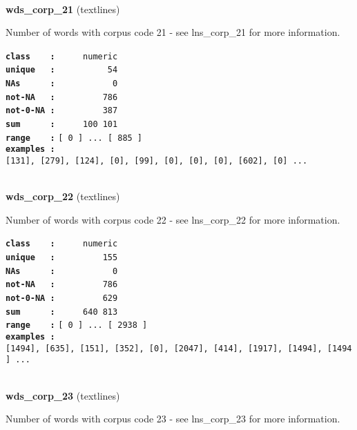 \documentclass[]{article}
\begin{document}
~

\textbf{wds\_corp\_21} (textlines)

Number of words with corpus code 21 - see lns\_corp\_21 for more
information.

\textbf{\texttt{class\ \ \ \ :}} \texttt{~~~~~numeric}\\
\textbf{\texttt{unique\ \ \ :}} \texttt{~~~~~~~~~~54}\\
\textbf{\texttt{NAs\ \ \ \ \ \ :}} \texttt{~~~~~~~~~~~0}\\
\textbf{\texttt{not-NA\ \ \ :}} \texttt{~~~~~~~~~786}\\
\textbf{\texttt{not-0-NA\ :}} \texttt{~~~~~~~~~387}\\
\textbf{\texttt{sum\ \ \ \ \ \ :}} \texttt{~~~~~100~101}\\
\textbf{\texttt{range\ \ \ \ :}}
\texttt{{[}\ 0\ {]}\ ...\ {[}\ 885\ {]}}\\
\textbf{\texttt{examples\ :}}
\texttt{{[}131{]},\ {[}279{]},\ {[}124{]},\ {[}0{]},\ {[}99{]},\ {[}0{]},\ {[}0{]},\ {[}0{]},\ {[}602{]},\ {[}0{]}\ ...}\\

~

\textbf{wds\_corp\_22} (textlines)

Number of words with corpus code 22 - see lns\_corp\_22 for more
information.

\textbf{\texttt{class\ \ \ \ :}} \texttt{~~~~~numeric}\\
\textbf{\texttt{unique\ \ \ :}} \texttt{~~~~~~~~~155}\\
\textbf{\texttt{NAs\ \ \ \ \ \ :}} \texttt{~~~~~~~~~~~0}\\
\textbf{\texttt{not-NA\ \ \ :}} \texttt{~~~~~~~~~786}\\
\textbf{\texttt{not-0-NA\ :}} \texttt{~~~~~~~~~629}\\
\textbf{\texttt{sum\ \ \ \ \ \ :}} \texttt{~~~~~640~813}\\
\textbf{\texttt{range\ \ \ \ :}}
\texttt{{[}\ 0\ {]}\ ...\ {[}\ 2938\ {]}}\\
\textbf{\texttt{examples\ :}}
\texttt{{[}1494{]},\ {[}635{]},\ {[}151{]},\ {[}352{]},\ {[}0{]},\ {[}2047{]},\ {[}414{]},\ {[}1917{]},\ {[}1494{]},\ {[}1494{]}\ ...}\\

~

\textbf{wds\_corp\_23} (textlines)

Number of words with corpus code 23 - see lns\_corp\_23 for more
information.
\end{document}
